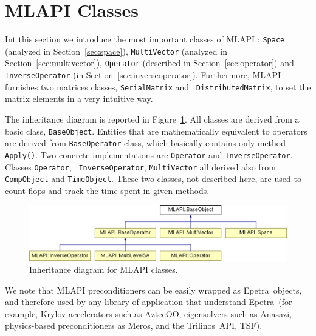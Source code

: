 \documentclass{article}[11pt]
\newcommand{\Aztecoo}  {{\sc AztecOO}}
\newcommand{\aztecoo}  {{\Aztecoo}}
\newcommand{\epetra}  {{\sc Epetra}}
\newcommand{\trilinos}  {{\sc Trilinos}}
\newcommand{\meros}  {{\sc Meros}}
\newcommand{\anasazi}  {{\sc Anasazi}}
\newcommand{\MLAPI}  {{\sc MLAPI }}
\begin{document}
\section{\MLAPI Classes}
\label{sec:basic}

Int this section we introduce the
most important classes of \MLAPI: {\tt Space} 
(analyzed in Section~\ref{sec:space}), {\tt MultiVector}
(analyzed in Section~\ref{sec:multivector}),
{\tt Operator} (described in Section~\ref{sec:operator}) and 
{\tt InverseOperator} (in Section~\ref{sec:inverseoperator}). Furthermore,
\MLAPI furnishes two matrices classes, {\tt SerialMatrix} and 
{\tt
  DistributedMatrix}, to set the matrix elements in a very intuitive 
  way.

The inheritance diagram is reported in Figure~\ref{fig:in}. All classes are
derived from a basic class, {\tt BaseObject}. Entities that are mathematically
equivalent to operators are derived from {\tt BaseOperator} class, which
basically contains only method {\tt Apply()}. Two concrete implementations are
{\tt Operator} and {\tt InverseOperator}.  Classes {\tt Operator}, {\tt
  InverseOperator}, {\tt MultiVector} all derived also from {\tt CompObject}
  and {\tt TimeObject}. These two classes, not  described here, are used to
  count flops and track the time spent in given methods. 

\begin{figure}
\begin{center}
\includegraphics[width=12cm]{MLAPI_classes.eps}
\caption{Inheritance diagram for \MLAPI classes.}
\label{fig:in}
\end{center}
\end{figure}

We note that \MLAPI preconditioners can be easily wrapped as \epetra\ objects,
  and therefore used by any library of application that understand \epetra\
  (for example, Krylov accelerators such as \aztecoo, eigensolvers such as
   \anasazi, physics-based preconditioners as \meros, and the \trilinos\ API,
   TSF).

\end{document}

